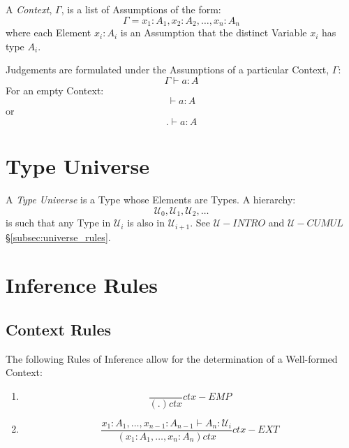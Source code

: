 \documentclass{article}
\begin{document}
A \emph{Context}, $\Gamma$, is a list of Assumptions of the form:
\[
    \Gamma = x_1 : A_1, x_2 : A_2, \ldots, x_n : A_n
\]
where each Element $x_i : A_i$ is an Assumption that the distinct
Variable $x_i$ has type $A_i$.

Judgements are formulated under the Assumptions of a particular
Context, $\Gamma$:
\[
    \Gamma \vdash a : A
\]
For an empty Context:
\[
    \vdash a : A
\]
or
\[
    . \vdash a : A
\]



\section{Type Universe}\label{sec:type_universe}

A \emph{Type Universe} is a Type whose Elements are Types. A hierarchy:
\[
    \mathcal{U}_0, \mathcal{U}_1, \mathcal{U}_2, \ldots
\]
is such that any Type in $\mathcal{U}_i$ is also in
$\mathcal{U}_{i+1}$. See $\mathcal{U}-INTRO$ and $\mathcal{U}-CUMUL$
\S\ref{subsec:universe_rules}.



\section{Inference Rules}\label{sec:type_inference}

\subsection{Context Rules}

The following Rules of Inference allow for the determination of a
Well-formed Context:
\begin{enumerate}
\item
\[
    {
        \frac{}{(.)ctx}
    } ctx-EMP
\]
\item
\[
    {
        \frac
        {x_1:A_1, \ldots, x_{n-1}:A_{n-1} \vdash A_n : \mathcal{U}_i}
        {(x_1:A_1,\ldots,x_n:A_n) ctx}
    } ctx-EXT
\]
\end{enumerate}
\end{document}
